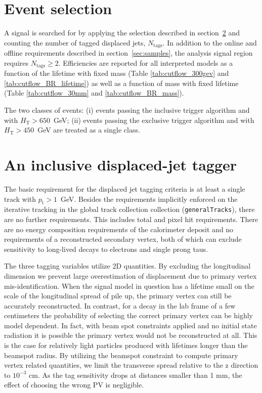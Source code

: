 \section{Event selection}

A signal is searched for by applying the selection described in
section~\ref{sec:tagger} and counting the number of tagged displaced
jets, $N_{\textrm{tags}}$.  In addition to the online and offline
requirements described in section~\ref{sec:samples}, the analysis
signal region requires $N_{\textrm{tags}} \geq 2$.  Efficiencies are
reported for all interpreted models as a function of the lifetime with
fixed mass (Table \ref{tab:cutflow_300gev} and
\ref{tab:cutflow_BR_lifetime}) as well as a function of mass with
fixed lifetime (Table \ref{tab:cutflow_30mm} and
\ref{tab:cutflow_BR_mass}).

The two classes of events: (i) events passing the inclusive trigger
algorithm and with $H_{\textrm{T}}>650$~GeV; (ii) events passing the
exclusive trigger algorithm and with $H_{\textrm{T}}>450$~GeV are
treated as a single class.  



\section{An inclusive displaced-jet tagger}

\label{sec:tagger}
The basic requirement for the displaced jet tagging criteria is at least a single track with $p_{\textrm{t}}>1$~GeV. 
Besides the requirements implicitly enforced on the iterative tracking in the global track collection collection (\texttt{generalTracks}), there are 
no further requirements. This includes total and pixel hit requirements.
There are no energy composition requirements of the calorimeter deposit
 and no requirements of a reconstructed secondary vertex, 
both of which can exclude sensitivity to long-lived decays
to electrons and single prong taus. 

The three tagging variables utilize 2D quantities. 
By excluding the longitudinal dimension we prevent large overestimation of displacement due to primary vertex mis-identification.
When the signal model in question has a lifetime small on the scale of the longitudinal spread of pile up, the primary vertex can still be accurately reconstructed. 
In contrast, for a decay in the lab frame of a few centimeters the probability of selecting the correct primary vertex can be highly model dependent. In fact, with
beam spot constraints applied and no initial state radiation it is possible the primary vertex would not be reconstructed at all. This is the case for relatively light particles produced with lifetimes longer than the beamspot radius. By utilizing the beamspot constraint to compute primary vertex 
related quantities, we limit the transverse spread relative to the z direction to  $10^{-3}$ cm. As the tag sensitivity drops at distances 
smaller than 1 mm, the effect of choosing the wrong PV is negligible. 

